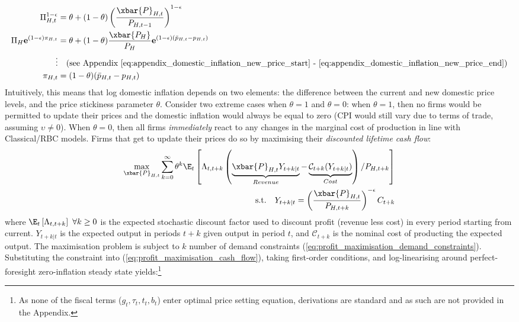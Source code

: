 \begin{align}
 \Pi_{H,t}^{1-\epsilon} &= \theta + (1-\theta)\left(\frac{\xbar{P}_{H,t}}{P_{H,t-1}}\right)^{1-\epsilon} \\
 \Pi_H \mathbf{e}^{(1-\epsilon)\pi_{H,t}} &= \theta + (1-\theta)\frac{\xbar{P_H}}{P_H}\mathbf{e}^{(1-\epsilon)(\bar{p}_{H,t} - p_{H,t})} \\
 \vdots & \quad \text{(see Appendix \ref{eq:appendix_domestic_inflation_new_price_start} - \ref{eq:appendix_domestic_inflation_new_price_end})} \nonumber \\
 \pi_{H,t} &= (1-\theta)(\bar{p}_{H,t} - p_{H,t}) \label{eq:domestic_inflation_new_price_relationship}
\end{align}
Intuitively, this means that log domestic inflation depends on two elements: the difference between the current and new domestic price levels, and the price stickiness parameter $\theta$. Consider two extreme cases when $\theta = 1$ and $\theta = 0$: when $\theta = 1$, then no firms would be permitted to update their prices and the domestic inflation would always be equal to zero (CPI would still vary due to terms of trade, assuming $\upsilon \ne 0$). When $\theta = 0$, then all firms \textit{immediately} react to any changes in the marginal cost of production in line with Classical/RBC models. Firms that get to update their prices do so by maximising their \textit{discounted lifetime cash flow}:
\begin{align}
 \max_{\xbar{P}_{H,t}} \sum_{k=0}^{\infty} \theta^k \E_t \left[\Lambda_{t,t+k} \left( \underbrace{\xbar{P}_{H,t} Y_{t+k|t}}_{Revenue} - \underbrace{\mathcal{C}_{t+k}(Y_{t+k|t})}_{Cost} \right) / P_{H,t+k} \right] \label{eq:profit_maximisation_cash_flow}\\
 \text{s.t.} \quad Y_{t+k|t} = \left(\frac{\xbar{P}_{H,t}}{P_{H,t+k}}\right)^{-\epsilon} C_{t+k} \label{eq:profit_maximisation_demand_constraints}
\end{align}
where $\E_t \left[\Lambda_{t,t+k}\right]\ \forall k \geq 0$ is the expected stochastic discount factor used to discount profit (revenue less cost) in every period starting from current. $Y_{t+k|t}$ is the expected output in periods $t+k$ given output in period $t$, and $\mathcal{C}_{t+k}$ is the nominal cost of producting the expected output. The maximisation problem is subject to $k$ number of demand constraints (\ref{eq:profit_maximisation_demand_constraints}). Substituting the constraint into (\ref{eq:profit_maximisation_cash_flow}), taking first-order conditions, and log-linearising around perfect-foresight zero-inflation steady state yields:\footnote{As none of the fiscal terms ($g_t, \tau_t, t_t, b_t$) enter optimal price setting equation, derivations are standard and as such are not provided in the Appendix. }
